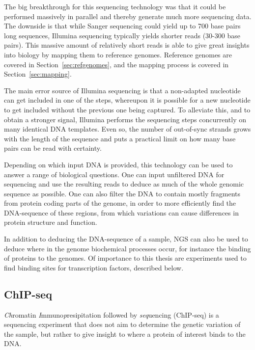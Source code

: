 The big breakthrough for this sequencing technology was that it could be performed massively in parallel and thereby generate much more sequencing data.
The downside is that while Sanger sequencing could yield up to 700 base pairs long sequences, Illumina sequencing typically yields shorter reads (30-300 base pairs).
This massive amount of relatively short reads is able to give great insights into biology by mapping them to reference genomes.
Reference genomes are covered in Section~\ref{sec:refgenomes}, and the mapping process is covered in Section~\ref{sec:mapping}.

The main error source of Illumina sequencing is that a non-adapted nucleotide can get included in one of the steps, whereupon it is possible for a new nucleotide to get included without the previous one being captured.
To alleviate this, and to obtain a stronger signal, Illumina performs the sequencing steps concurrently on many identical DNA templates. Even so, the number of out-of-sync strands grows with the length of the sequence and puts a practical limit on how many base pairs can be read with certainty.

Depending on which input DNA is provided, this technology can be used to answer a range of biological questions.
One can input unfiltered DNA for sequencing and use the resulting reads to deduce as much of the whole genomic sequence as possible. One can also filter the DNA to contain mostly fragments from protein coding parts of the genome, in order to more efficiently find the DNA-sequence of these regions, from which variations can cause differences in protein structure and function.

In addition to deducing the DNA-sequence of a sample, NGS can also be used to deduce where in the genome biochemical processes occur, for instance the binding of proteins to the genomes. Of importance to this thesis are experiments used to find binding sites for transcription factors, described below.

\subsection{ChIP-seq}
\emph{Ch}romatin \emph{I}mmuno\emph{p}resipitation  followed by \emph{seq}uencing (ChIP-seq) is a sequencing experiment that does not aim to determine the genetic variation of the sample, but rather to give insight to where a protein of interest binds to the DNA.

